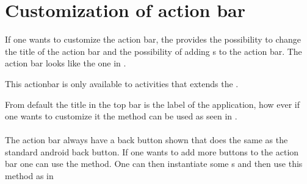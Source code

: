 \chapter{Customization of action bar}
\label{app:customization_of_action_bar}


If one wants to customize the action bar, the  provides the possibility to change the title of the action bar and the possibility of adding s to the action bar. The action bar looks like the one in . 

\begin{note}
    This actionbar is only available to activities that extends the .
\end{note}

\noindent
From default the title in the top bar is the label of the application, how ever if one wants to customize it the  method can be used as seen in .
\\\\
The action bar always have a back button shown that does the same as the standard android back button. If one wants to add more buttons to the action bar one can use the  method. One can then instantiate some s and then use this method as in 


